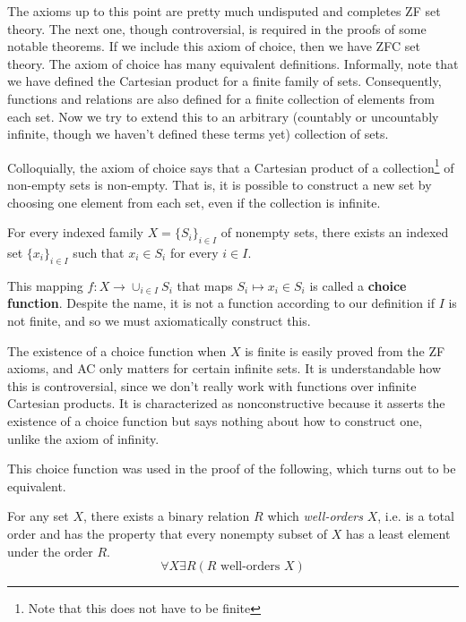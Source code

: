 \documentclass{article}
\begin{document}
    The axioms up to this point are pretty much undisputed and completes ZF set theory. The next one, though controversial, is required in the proofs of some notable theorems. If we include this axiom of choice, then we have ZFC set theory. The axiom of choice has many equivalent definitions. Informally, note that we have defined the Cartesian product for a finite family of sets. Consequently, functions and relations are also defined for a finite collection of elements from each set. Now we try to extend this to an arbitrary (countably or uncountably infinite, though we haven't defined these terms yet) collection of sets. 

    Colloquially, the axiom of choice says that a Cartesian product of a collection\footnote{Note that this does not have to be finite} of non-empty sets is non-empty. That is, it is possible to construct a new set by choosing one element from each set, even if the collection is infinite. 

    \begin{axiom}
      For every indexed family $X = \{S_i\}_{i \in I}$ of nonempty sets, there exists an indexed set $\{x_i\}_{i \in I}$ such that $x_i \in S_i$ for every $i \in I$. 
    \end{axiom}

    \begin{definition}
      This mapping $f: X \rightarrow \cup_{i \in I} S_i$ that maps $S_i \mapsto x_i \in S_i$ is called a \textbf{choice function}. Despite the name, it is not a function according to our definition if $I$ is not finite, and so we must axiomatically construct this. 
    \end{definition}

    The existence of a choice function when $X$ is finite is easily proved from the ZF axioms, and AC only matters for certain infinite sets. It is understandable how this is controversial, since we don't really work with functions over infinite Cartesian products. It is characterized as nonconstructive because it asserts the existence of a choice function but says nothing about how to construct one, unlike the axiom of infinity.  

    This choice function was used in the proof of the following, which turns out to be equivalent. 

    \begin{axiom}
      For any set $X$, there exists a binary relation $R$ which \textit{well-orders} $X$, i.e. is a total order and has the property that every nonempty subset of $X$ has a least element under the order $R$. 
      \begin{equation}
        \forall X \exists R (R \text{ well-orders } X)
      \end{equation}
    \end{axiom}
\end{document}
